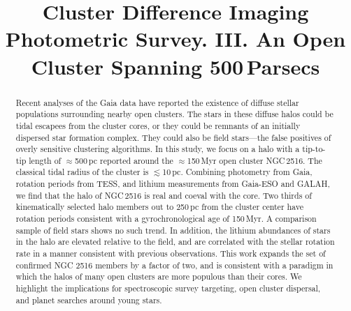\documentclass[12pt,twocolumn,tighten]{aastex63}
\begin{document}

\title{
  Cluster Difference Imaging Photometric Survey. III.
  An Open Cluster Spanning 500\,Parsecs
}



\begin{abstract}
  Recent analyses of the Gaia data have reported the existence of
  diffuse stellar populations surrounding nearby open clusters. 
  The stars in these diffuse halos could be tidal escapees from the
  cluster cores, or they could be remnants of an initially dispersed
  star formation complex.
  They could also be field stars---the false positives of overly
  sensitive clustering algorithms.
  In this study, we focus on a halo with a tip-to-tip length of
  $\approx$500\,pc reported around the $\approx$150\,Myr open cluster
  NGC\,2516.
  The classical tidal radius of the cluster is $\lesssim$10\,pc.
  Combining photometry from Gaia, rotation periods from TESS, and
  lithium measurements from Gaia-ESO and GALAH, we find that the halo
  of NGC\,2516 is real and coeval with the core.
  Two thirds of kinematically selected halo members out to 250\,pc from the
  cluster center have rotation periods consistent with a
  gyrochronological age of 150\,Myr.
  A comparison sample of field stars shows no such trend.
  In addition, the lithium abundances of stars in the halo are
  elevated relative to the field, and are correlated with the stellar
  rotation rate in a manner consistent with previous observations.
  This work expands the set of confirmed NGC 2516 members by a factor
  of two, and is consistent with a paradigm in which the halos of many
  open clusters are more populous than their cores.
  We highlight the implications for spectroscopic survey targeting,
  open cluster dispersal, and planet searches around young stars.
\end{abstract}

\end{document}
